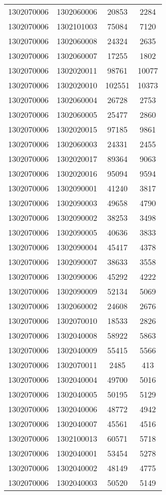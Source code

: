 \begin{longtable}{llcc}
1302070006 & 1302060006 & 20853 & 2284\\
1302070006 & 1302101003 & 75084 & 7120\\
1302070006 & 1302060008 & 24324 & 2635\\
1302070006 & 1302060007 & 17255 & 1802\\
1302070006 & 1302020011 & 98761 & 10077\\
1302070006 & 1302020010 & 102551 & 10373\\
1302070006 & 1302060004 & 26728 & 2753\\
1302070006 & 1302060005 & 25477 & 2860\\
1302070006 & 1302020015 & 97185 & 9861\\
1302070006 & 1302060003 & 24331 & 2455\\
1302070006 & 1302020017 & 89364 & 9063\\
1302070006 & 1302020016 & 95094 & 9594\\
1302070006 & 1302090001 & 41240 & 3817\\
1302070006 & 1302090003 & 49658 & 4790\\
1302070006 & 1302090002 & 38253 & 3498\\
1302070006 & 1302090005 & 40636 & 3833\\
1302070006 & 1302090004 & 45417 & 4378\\
1302070006 & 1302090007 & 38633 & 3558\\
1302070006 & 1302090006 & 45292 & 4222\\
1302070006 & 1302090009 & 52134 & 5069\\
1302070006 & 1302060002 & 24608 & 2676\\
1302070006 & 1302070010 & 18533 & 2826\\
1302070006 & 1302040008 & 58922 & 5863\\
1302070006 & 1302040009 & 55415 & 5566\\
1302070006 & 1302070011 & 2485 & 413\\
1302070006 & 1302040004 & 49700 & 5016\\
1302070006 & 1302040005 & 50195 & 5129\\
1302070006 & 1302040006 & 48772 & 4942\\
1302070006 & 1302040007 & 45561 & 4516\\
1302070006 & 1302100013 & 60571 & 5718\\
1302070006 & 1302040001 & 53454 & 5278\\
1302070006 & 1302040002 & 48149 & 4775\\
1302070006 & 1302040003 & 50520 & 5149\\

\end{longtable}

